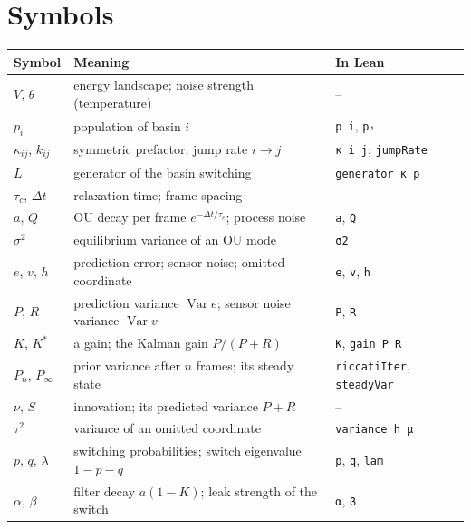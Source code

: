 \documentclass[11pt]{article}
\newcommand{\leanus}{\textunderscore\allowbreak}%
\newcommand{\lean}[1]{\begingroup\let\_\leanus\texttt{#1}\endgroup}
\newcommand{\Var}{\operatorname{Var}}
\begin{document}
\section{Symbols}\label{app:symbols}

\begin{center}\small
  \begin{tabularx}{\linewidth}{@{}l>{\raggedright\arraybackslash}X l@{}}
    \toprule
    \textbf{Symbol} & \textbf{Meaning} & \textbf{In Lean} \\
    \midrule
    $V$, $\theta$ & energy landscape; noise strength (temperature) & -- \\
    $p_i$ & population of basin $i$ & \lean{p i}, \lean{pᵢ} \\
    $\kappa_{ij}$, $k_{ij}$ & symmetric prefactor; jump rate $i \to j$ & \lean{κ i j};
      \lean{jumpRate} \\
    $L$ & generator of the basin switching & \lean{generator κ p} \\
    $\tau_c$, $\Delta t$ & relaxation time; frame spacing & -- \\
    $a$, $Q$ & OU decay per frame $e^{-\Delta t/\tau_c}$; process noise & \lean{a}, \lean{Q} \\
    $\sigma^2$ & equilibrium variance of an OU mode & \lean{σ2} \\
    $e$, $v$, $h$ & prediction error; sensor noise; omitted coordinate & \lean{e}, \lean{v},
      \lean{h} \\
    $P$, $R$ & prediction variance $\Var e$; sensor noise variance $\Var v$ & \lean{P},
      \lean{R} \\
    $K$, $K^*$ & a gain; the Kalman gain $P/(P + R)$ & \lean{K}, \lean{gain P R} \\
    $P_n$, $P_\infty$ & prior variance after $n$ frames; its steady state &
      \lean{riccatiIter}, \lean{steadyVar} \\
    $\nu$, $S$ & innovation; its predicted variance $P + R$ & -- \\
    $\tau^2$ & variance of an omitted coordinate & \lean{variance h μ} \\
    $p$, $q$, $\lambda$ & switching probabilities; switch eigenvalue $1 - p - q$ & \lean{p},
      \lean{q}, \lean{lam} \\
    $\alpha$, $\beta$ & filter decay $a(1 - K)$; leak strength of the switch & \lean{α},
      \lean{β} \\
    \bottomrule
  \end{tabularx}
\end{center}
\end{document}

